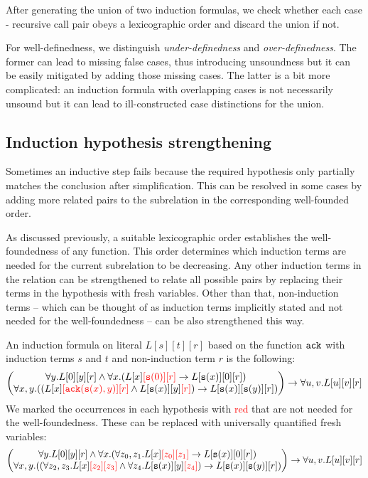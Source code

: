 After generating the union of two induction formulas, we check whether each case - recursive call pair obeys a lexicographic order and discard the union if not.

For well-definedness, we distinguish \textit{under-definedness} and \textit{over-definedness}. The former can lead to missing false cases, thus introducing unsoundness but it can be easily mitigated by adding those missing cases. The latter is a bit more complicated: an induction formula with overlapping cases is not necessarily unsound but it can lead to ill-constructed case distinctions for the union. 

\subsection{Induction hypothesis strengthening}
Sometimes an inductive step fails because the required hypothesis only partially matches the conclusion after simplification. This can be resolved in some cases by adding more related pairs to the subrelation in the corresponding well-founded order.

As discussed previously, a suitable lexicographic order establishes the well-foundedness of any function. This order determines which induction terms are needed for the current subrelation to be decreasing. Any other induction terms in the relation can be strengthened to relate all possible pairs by replacing their terms in the hypothesis with fresh variables. Other than that, non-induction terms -- which can be thought of as induction terms implicitly stated and not needed for the well-foundedness -- can be also strengthened this way.

\begin{example}
	An induction formula on literal $L[s][t][r]$ based on the function $\mathtt{ack}$ with induction terms $s$ and $t$ and non-induction term $r$ is the following:
	$$\begin{pmatrix}\forall y.L[0][y][r]\land \forall x.(L[x]\textcolor{red}{[\mathtt{s}(0)][r]}\rightarrow L[\mathtt{s}(x)][0][r])\\
	\forall x,y.((L[x]\textcolor{red}{[\mathtt{ack}(\mathtt{s}(x),y)][r]}\land L[\mathtt{s}(x)][y]\textcolor{red}{[r]})\rightarrow L[\mathtt{s}(x)][\mathtt{s}(y)][r])\end{pmatrix}\rightarrow \forall u,v.L[u][v][r]$$
	We marked the occurrences in each hypothesis with \textcolor{red}{red} that are not needed for the well-foundedness. These can be replaced with universally quantified fresh variables:
	$$\begin{pmatrix}\forall y.L[0][y][r]\land \forall x.(\forall z_0,z_1.L[x]\textcolor{red}{[z_0][z_1]}\rightarrow L[\mathtt{s}(x)][0][r])\\
	\forall x,y.((\forall z_2,z_3.L[x]\textcolor{red}{[z_2][z_3]}\land \forall z_4.L[\mathtt{s}(x)][y]\textcolor{red}{[z_4]})\rightarrow L[\mathtt{s}(x)][\mathtt{s}(y)][r])\end{pmatrix}\rightarrow \forall u,v.L[u][v][r]$$
\end{example}

